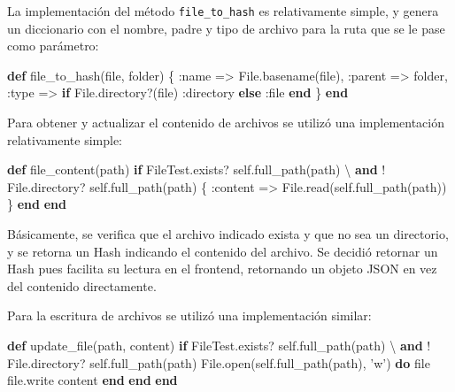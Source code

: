 \documentclass[12pt,titlepage,]{article}
\newenvironment{Shaded}{}{}
\newcommand{\KeywordTok}[1]{\textcolor[rgb]{0.00,0.44,0.13}{\textbf{{#1}}}}
\newcommand{\DataTypeTok}[1]{\textcolor[rgb]{0.56,0.13,0.00}{{#1}}}
\newcommand{\DecValTok}[1]{\textcolor[rgb]{0.25,0.63,0.44}{{#1}}}
\newcommand{\StringTok}[1]{\textcolor[rgb]{0.25,0.44,0.63}{{#1}}}
\newcommand{\NormalTok}[1]{{#1}}
\begin{document}
La implementación del método \texttt{file\_to\_hash} es relativamente
simple, y genera un diccionario con el nombre, padre y tipo de archivo
para la ruta que se le pase como parámetro:

\begin{Shaded}
\begin{Highlighting}[]
\KeywordTok{def} \NormalTok{file_to_hash(file, folder)}
  \NormalTok{\{}
    \StringTok{:name} \NormalTok{=> }\DataTypeTok{File}\NormalTok{.basename(file),}
    \StringTok{:parent} \NormalTok{=> folder,}
    \StringTok{:type} \NormalTok{=> }\KeywordTok{if} \DataTypeTok{File}\NormalTok{.directory?(file)}
      \StringTok{:directory}
    \KeywordTok{else}
      \StringTok{:file}
    \KeywordTok{end}
  \NormalTok{\}}
\KeywordTok{end}
\end{Highlighting}
\end{Shaded}

Para obtener y actualizar el contenido de archivos se utilizó una
implementación relativamente simple:

\begin{Shaded}
\begin{Highlighting}[]
\KeywordTok{def} \NormalTok{file_content(path)}
  \KeywordTok{if} \DataTypeTok{FileTest}\NormalTok{.exists? }\DecValTok{self}\NormalTok{.full_path(path) \textbackslash{}}
     \KeywordTok{and}\NormalTok{ ! }\DataTypeTok{File}\NormalTok{.directory? }\DecValTok{self}\NormalTok{.full_path(path)}
    \NormalTok{\{}
      \StringTok{:content} \NormalTok{=> }\DataTypeTok{File}\NormalTok{.read(}\DecValTok{self}\NormalTok{.full_path(path))}
    \NormalTok{\}}
  \KeywordTok{end}
\KeywordTok{end}
\end{Highlighting}
\end{Shaded}

Básicamente, se verifica que el archivo indicado exista y que no sea un
directorio, y se retorna un Hash indicando el contenido del archivo. Se
decidió retornar un Hash pues facilita su lectura en el frontend,
retornando un objeto JSON en vez del contenido directamente.

Para la escritura de archivos se utilizó una implementación similar:

\begin{Shaded}
\begin{Highlighting}[]
\KeywordTok{def} \NormalTok{update_file(path, content)}
  \KeywordTok{if} \DataTypeTok{FileTest}\NormalTok{.exists? }\DecValTok{self}\NormalTok{.full_path(path) \textbackslash{}}
     \KeywordTok{and}\NormalTok{ ! }\DataTypeTok{File}\NormalTok{.directory? }\DecValTok{self}\NormalTok{.full_path(path)}
    \DataTypeTok{File}\NormalTok{.open(}\DecValTok{self}\NormalTok{.full_path(path), }\StringTok{'w'}\NormalTok{) }\KeywordTok{do} \NormalTok{\textbar{}file\textbar{}}
      \NormalTok{file.write content}
    \KeywordTok{end}
  \KeywordTok{end}
\KeywordTok{end}
\end{Highlighting}
\end{Shaded}
\end{document}
